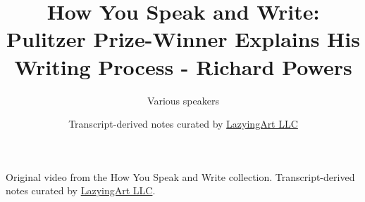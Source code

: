 \documentclass[11pt,oneside]{book}
\begin{document}
\frontmatter
\title{How You Speak and Write: Pulitzer Prize-Winner Explains His Writing Process - Richard Powers}
\author{Various speakers}
\date{Transcript-derived notes curated by \href{https://lazying.art}{LazyingArt LLC}}
\maketitle
\begin{center}
\small Original video from the How You Speak and Write collection. Transcript-derived notes curated by \href{https://lazying.art}{LazyingArt LLC}.
\end{center}
\clearpage
\mainmatter

\end{document}
